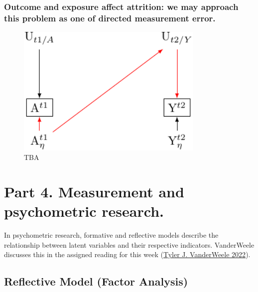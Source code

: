 \documentclass[
  singlecolumn]{report}
\begin{document}
\hypertarget{outcome-and-exposure-affect-attrition-we-may-approach-this-problem-as-one-of-directed-measurement-error.}{%
\subsubsection{Outcome and exposure affect attrition: we may approach
this problem as one of directed measurement
error.}\label{outcome-and-exposure-affect-attrition-we-may-approach-this-problem-as-one-of-directed-measurement-error.}}

\begin{figure}

{\centering \includegraphics[width=0.8\textwidth,height=\textheight]{causal-dags_files/figure-pdf/fig-directed-measurement-error-1.pdf}

}

\caption{\label{fig-directed-measurement-error}TBA}

\end{figure}

\hypertarget{part-4.-measurement-and-psychometric-research.}{%
\section{Part 4. Measurement and psychometric
research.}\label{part-4.-measurement-and-psychometric-research.}}

In psychometric research, formative and reflective models describe the
relationship between latent variables and their respective indicators.
VanderWeele discusses this in the assigned reading for this week
(\protect\hyperlink{ref-vanderweele2022}{Tyler J. VanderWeele 2022}).

\hypertarget{reflective-model-factor-analysis}{%
\subsection{Reflective Model (Factor
Analysis)}\label{reflective-model-factor-analysis}}
\end{document}
